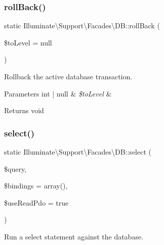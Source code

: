 \subsubsection{\texorpdfstring{roll\+Back()}{rollBack()}}
{\footnotesize\ttfamily static Illuminate\textbackslash{}\+Support\textbackslash{}\+Facades\textbackslash{}\+D\+B\+::roll\+Back (\begin{DoxyParamCaption}\item[{}]{\$to\+Level = {\ttfamily null} }\end{DoxyParamCaption})\hspace{0.3cm}{\ttfamily [static]}}

Rollback the active database transaction.


\begin{DoxyParams}[1]{Parameters}
int | null & {\em \$to\+Level} & \\
\hline
\end{DoxyParams}
\begin{DoxyReturn}{Returns}
void 
\end{DoxyReturn}
\mbox{\label{class_illuminate_1_1_support_1_1_facades_1_1_d_b_a5a38160aff9e989f346ceb97d1b765c7}} 
\subsubsection{\texorpdfstring{select()}{select()}}
{\footnotesize\ttfamily static Illuminate\textbackslash{}\+Support\textbackslash{}\+Facades\textbackslash{}\+D\+B\+::select (\begin{DoxyParamCaption}\item[{}]{\$query,  }\item[{}]{\$bindings = {\ttfamily array()},  }\item[{}]{\$use\+Read\+Pdo = {\ttfamily true} }\end{DoxyParamCaption})\hspace{0.3cm}{\ttfamily [static]}}

Run a select statement against the database.


